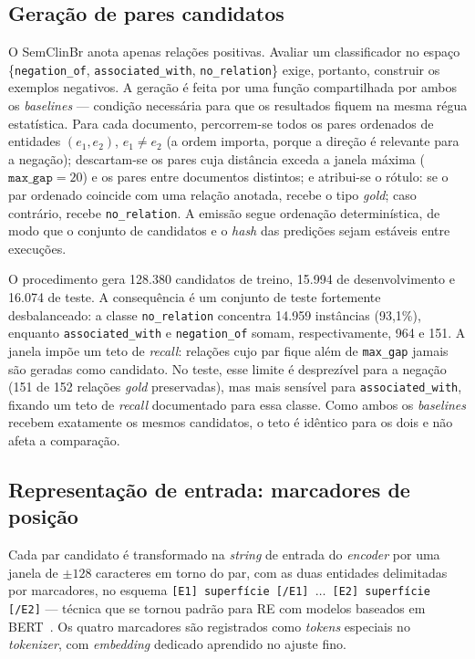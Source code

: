 \documentclass[12pt]{article}
\begin{document}
\subsection{Geração de pares candidatos}
O SemClinBr anota apenas relações positivas. Avaliar um classificador no espaço
\{\texttt{negation\_of}, \texttt{associated\_with}, \texttt{no\_relation}\} exige,
portanto, construir os exemplos negativos. A geração é feita por uma função
compartilhada por ambos os \emph{baselines} --- condição necessária para que os
resultados fiquem na mesma régua estatística. Para cada documento, percorrem-se
todos os pares ordenados de entidades $(e_1, e_2)$, $e_1 \neq e_2$ (a ordem
importa, porque a direção é relevante para a negação); descartam-se os pares cuja
distância exceda a janela máxima ($\texttt{max\_gap}=20$) e os pares entre
documentos distintos; e atribui-se o rótulo: se o par ordenado coincide com uma
relação anotada, recebe o tipo \emph{gold}; caso contrário, recebe
\texttt{no\_relation}. A emissão segue ordenação determinística, de modo que o
conjunto de candidatos e o \emph{hash} das predições sejam estáveis entre
execuções.

O procedimento gera 128.380 candidatos de treino, 15.994 de desenvolvimento e
16.074 de teste. A consequência é um conjunto de teste fortemente desbalanceado:
a classe \texttt{no\_relation} concentra 14.959 instâncias (93,1\%), enquanto
\texttt{associated\_with} e \texttt{negation\_of} somam, respectivamente, 964 e
151. A janela impõe um teto de \emph{recall}: relações cujo par fique além de
\texttt{max\_gap} jamais são geradas como candidato. No teste, esse limite é
desprezível para a negação (151 de 152 relações \emph{gold} preservadas), mas
mais sensível para \texttt{associated\_with}, fixando um teto de \emph{recall}
documentado para essa classe. Como ambos os \emph{baselines} recebem exatamente
os mesmos candidatos, o teto é idêntico para os dois e não afeta a comparação.

\subsection{Representação de entrada: marcadores de posição}
Cada par candidato é transformado na \emph{string} de entrada do \emph{encoder}
por uma janela de $\pm128$ caracteres em torno do par, com as duas entidades
delimitadas por marcadores, no esquema
\texttt{[E1] superfície [/E1] $\ldots$ [E2] superfície [/E2]} --- técnica que se
tornou padrão para RE com modelos baseados em BERT~\cite{soares:19}. Os quatro
marcadores são registrados como \emph{tokens} especiais no \emph{tokenizer}, com
\emph{embedding} dedicado aprendido no ajuste fino.
\end{document}
